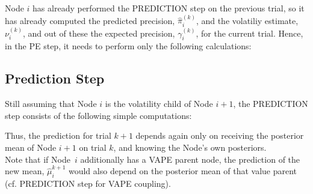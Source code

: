 Node $i$ has already performed the \textsf{PREDICTION step} on the previous trial, so it has already computed the predicted precision, $\hat{\pi}_{i}^{(k)}$, and the volatiliy estimate, $\nu_i^{(k)}$, and out of these the expected precision, $\gamma_{i}^{(k)}$, for the current trial. Hence, in the \textsf{PE step}, it needs to perform only the following calculations:
\vspace{0.5cm}

\noindent
{}%
\vspace{0.5cm}

\noindent

\subsection{Prediction Step}
Still assuming that Node $i$ is the volatility child of Node $i+1$, the \textsf{PREDICTION step} consists of the following simple computations:
\vspace{0.5cm}

\noindent
{}%
\vspace{0.5cm}

\noindent
Thus, the prediction for trial $k+1$ depends again only on receiving the posterior mean of Node $i+1$ on trial $k$, and knowing the Node's own posteriors.\\

Note that if Node~$i$ additionally has a \textsf{VAPE} parent node, the prediction of the new mean, $\hat{\mu}_i^{k+1}$ would also depend on the posterior mean of that value parent (cf. \textsf{PREDICTION step} for \textsf{VAPE} coupling).
